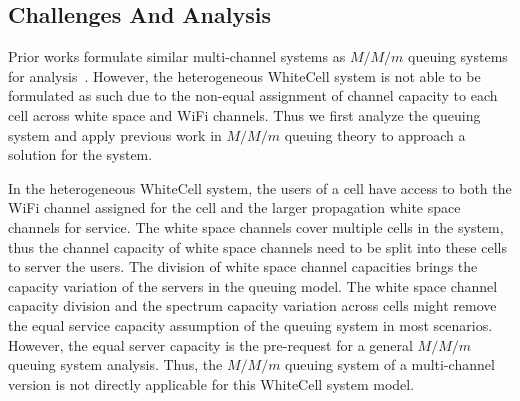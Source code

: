 \subsection{Challenges And Analysis}
\label{subsec:challenge}
Prior works formulate similar multi-channel systems as $M/M/m$ queuing systems for 
analysis~\cite{bodas2012low}. However, the heterogeneous WhiteCell system is not 
able to be formulated as such due to the non-equal assignment of channel capacity 
to each cell across white space and WiFi channels.
Thus we first analyze the queuing system and apply previous work in $M/M/m$ queuing 
theory to approach a solution for the system.

In the heterogeneous WhiteCell system, the users of a cell have access to both the WiFi 
channel assigned for the cell and the larger propagation white space channels for service. 
The white space channels cover multiple cells in the system, thus the channel capacity of white space channels need to be split into these cells 
to server the users.
The division of white space channel capacities brings the capacity variation of the servers 
in the queuing model.
The white space channel capacity division and the spectrum capacity variation across cells 
might remove the equal service capacity assumption of the queuing system in most scenarios.
However, the equal server capacity is the pre-request for a general $M/M/m$ queuing system 
analysis. Thus, the $M/M/m$ queuing system of a multi-channel version is not directly applicable 
for this WhiteCell system model.


